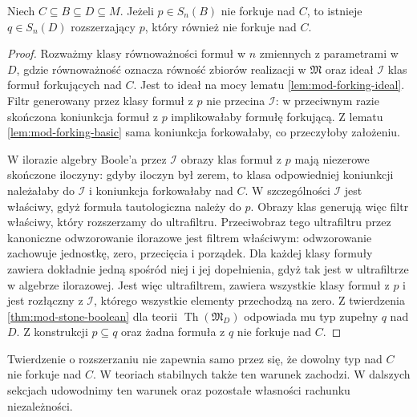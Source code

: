 \begin{twierdzenie}
\label{thm:mod-nonforking-extension}
Niech $C\subseteq B\subseteq D\subseteq M$.
Jeżeli $p\in S_n(B)$ nie forkuje nad $C$,
to istnieje $q\in S_n(D)$ rozszerzający $p$,
który również nie forkuje nad $C$.
\end{twierdzenie}
\begin{proof}
Rozważmy klasy równoważności formuł w $n$ zmiennych
z parametrami w $D$, gdzie równoważność oznacza
równość zbiorów realizacji w $\mathfrak M$
oraz ideał $\mathcal I$ klas formuł forkujących
nad $C$. Jest to ideał na mocy lematu
\ref{lem:mod-forking-ideal}.
Filtr generowany przez klasy formuł z $p$
nie przecina $\mathcal I$: w przeciwnym razie
skończona koniunkcja formuł z $p$ implikowałaby
formułę forkującą. Z lematu
\ref{lem:mod-forking-basic} sama koniunkcja
forkowałaby, co przeczyłoby założeniu.

W ilorazie algebry Boole'a przez $\mathcal I$
obrazy klas formuł z $p$ mają niezerowe
skończone iloczyny: gdyby iloczyn był zerem,
to klasa odpowiedniej koniunkcji należałaby do
$\mathcal I$ i koniunkcja forkowałaby nad $C$.
W szczególności $\mathcal I$ jest właściwy,
gdyż formuła tautologiczna należy do $p$.
Obrazy klas generują więc filtr
właściwy, który rozszerzamy do ultrafiltru.
Przeciwobraz tego ultrafiltru przez kanoniczne
odwzorowanie ilorazowe jest filtrem właściwym:
odwzorowanie zachowuje jednostkę, zero, przecięcia
i porządek. Dla każdej klasy formuły zawiera
dokładnie jedną spośród niej i jej dopełnienia,
gdyż tak jest w ultrafiltrze w algebrze ilorazowej.
Jest więc ultrafiltrem, zawiera wszystkie klasy
formuł z $p$ i jest rozłączny z $\mathcal I$,
którego wszystkie elementy przechodzą na zero.
Z twierdzenia \ref{thm:mod-stone-boolean}
dla teorii $\operatorname{Th}(\mathfrak M_D)$
odpowiada mu typ zupełny $q$ nad $D$.
Z konstrukcji $p\subseteq q$ oraz żadna
formuła z $q$ nie forkuje nad $C$.
\end{proof}

Twierdzenie o rozszerzaniu nie zapewnia samo
przez się, że dowolny typ nad $C$ nie forkuje
nad $C$. W teoriach stabilnych także ten
warunek zachodzi. W dalszych sekcjach udowodnimy ten warunek
oraz pozostałe własności rachunku niezależności.

